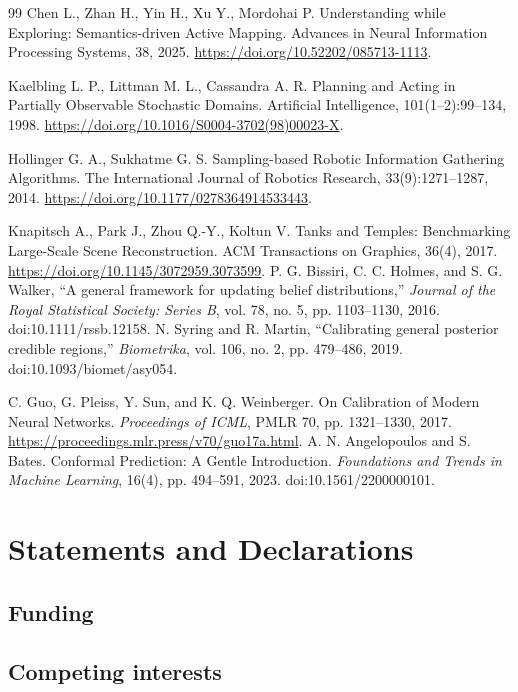 \documentclass[11pt,a4paper]{article}
\begin{document}
\begin{thebibliography}{99}
 Chen L., Zhan H., Yin H., Xu Y., Mordohai P. Understanding while Exploring: Semantics-driven Active Mapping. Advances in Neural Information Processing Systems, 38, 2025. \url{https://doi.org/10.52202/085713-1113}.

 Kaelbling L. P., Littman M. L., Cassandra A. R. Planning and Acting in Partially Observable Stochastic Domains. Artificial Intelligence, 101(1--2):99--134, 1998. \url{https://doi.org/10.1016/S0004-3702(98)00023-X}.

 Hollinger G. A., Sukhatme G. S. Sampling-based Robotic Information Gathering Algorithms. The International Journal of Robotics Research, 33(9):1271--1287, 2014. \url{https://doi.org/10.1177/0278364914533443}.

 Knapitsch A., Park J., Zhou Q.-Y., Koltun V. Tanks and Temples: Benchmarking Large-Scale Scene Reconstruction. ACM Transactions on Graphics, 36(4), 2017. \url{https://doi.org/10.1145/3072959.3073599}.
 P. G. Bissiri, C. C. Holmes, and S. G. Walker,
``A general framework for updating belief distributions,''
\emph{Journal of the Royal Statistical Society: Series B}, vol. 78,
no. 5, pp. 1103--1130, 2016. doi:10.1111/rssb.12158.
 N. Syring and R. Martin,
``Calibrating general posterior credible regions,''
\emph{Biometrika}, vol. 106, no. 2, pp. 479--486, 2019.
doi:10.1093/biomet/asy054.


 C. Guo, G. Pleiss, Y. Sun, and K. Q. Weinberger.
On Calibration of Modern Neural Networks. \emph{Proceedings of ICML},
PMLR 70, pp. 1321--1330, 2017. \url{https://proceedings.mlr.press/v70/guo17a.html}.
 A. N. Angelopoulos and S. Bates.
Conformal Prediction: A Gentle Introduction. \emph{Foundations and Trends in Machine Learning},
16(4), pp. 494--591, 2023. doi:10.1561/2200000101.

\end{thebibliography}

\section*{Statements and Declarations}
\subsection*{Funding}
\textit{} \underline{\hspace{5cm}}
\subsection*{Competing interests}
\textit{} \underline{\hspace{5cm}}
\end{document}
